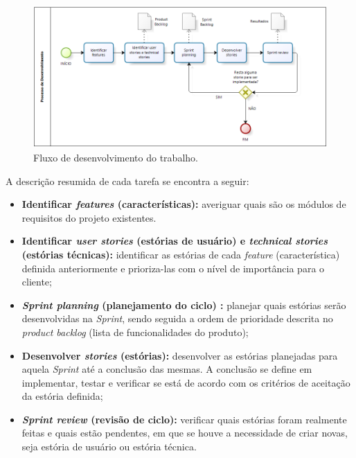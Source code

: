 \begin{figure}[H]
    \centering
    \includegraphics[scale=0.6]{figuras/proposta/fluxo_scrum.png}
    \caption[Fluxo de desenvolvimento do trabalho]{Fluxo de desenvolvimento do trabalho.}
    \label{fig:fluxo_scrum}
\end{figure}

A descrição resumida de cada tarefa se encontra a seguir:

\begin{itemize}
    \item \textbf{Identificar \textit{features} (características):} averiguar quais são os módulos de requisitos do projeto existentes.
    
    \item \textbf{Identificar \textit{user stories} (estórias de usuário) e \textit{technical stories} (estórias técnicas):} identificar as estórias de cada \textit{feature} (característica) definida anteriormente e prioriza-las com o nível de importância para o cliente;
    
    \item \textbf{\textit{Sprint planning} (planejamento do ciclo) :} planejar quais estórias serão desenvolvidas na \textit{Sprint}, sendo seguida a ordem de prioridade descrita no \textit{product backlog} (lista de funcionalidades do produto);
    
    \item \textbf{Desenvolver \textit{stories} (estórias):} desenvolver as estórias planejadas para aquela \textit{Sprint} até a conclusão das mesmas. A conclusão se define em implementar, testar e verificar se está de acordo com os critérios de aceitação da estória definida;
    
    \item \textbf{\textit{Sprint review} (revisão de ciclo):} verificar quais estórias foram realmente feitas e quais estão pendentes, em que se houve a necessidade de criar novas, seja estória de usuário ou estória técnica.
\end{itemize}

